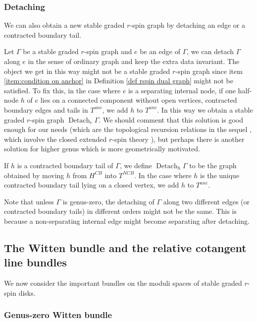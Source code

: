 \documentclass[11pt,a4paper]{article}
\theoremstyle{definition}
\theoremstyle{remark}
\numberwithin{equation}{section}
\begin{document}
\subsubsection*{Detaching}
We can also obtain a new stable graded $r$-spin graph by detaching an edge or a contracted boundary tail.

Let $\Gamma$ be a stable  graded $r$-spin graph and $e$ be an edge of $\Gamma$, we can detach $\Gamma$ along $e$ in the sense of ordinary graph and keep the extra data invariant. The object we get in this way might not be a stable graded $r$-spin graph since item \ref{item:condition on anchor} in Definition \ref{def rspin dual graph} might not be satisfied. To fix this, in the case where $e$ is a separating internal node, if one half-node $h$ of $e$ lies on a connected component without open vertices, contracted boundary edges and tails in $T^{anc}$, we add $h$ to $T^{anc}$. In this way we obtain a stable graded $r$-spin graph $\operatorname{Detach}_e \Gamma$. We should comment that this solution is good enough for our needs (which are the topological recursion relations in the sequel \cite{TZ2}, which involve the closed extended $r$-spin theory \cite{BCT_Closed_Extended}), but perhaps there is another solution for higher genus which is more geometrically motivated.

 If $h$ is a contracted boundary tail of $\Gamma$, we define $\operatorname{Detach}_h\Gamma$ to be the graph obtained by moving $h$ from $H^{CB}$ into $T^{NCB}$. In the case where $h$ is the unique contracted boundary tail lying on a closed vertex, we add $h$ to $T^{anc}$.

 Note that unless $\Gamma$ is genus-zero, the detaching of $\Gamma$ along two different edges (or contracted boundary tails) in different orders might not be the same. This is because a non-separating internal edge might become separating after detaching.




\subsection{The Witten bundle and the relative cotangent line bundles}
\label{subsec:Wittenbundle}
We now consider the important bundles on the moduli spaces of stable graded $r$-spin disks.

  
\subsubsection{Genus-zero Witten bundle}
\end{document}
